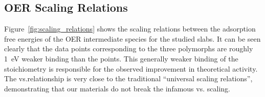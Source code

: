 \subsection{OER Scaling Relations}  %
%


%
%
Figure~\ref{fig:scaling_relations} shows the scaling relations between the adsorption free energies of the OER intermediate species for the studied \IrOx slabs.
%
It can be seen clearly that the data points corresponding to the three \IrOthree polymorphs are roughly \SI{1}{\electronvolt} weaker binding than the \rIrOtwo points.
%
This generally weaker binding of the \IrOthree stoichiometry is responsible for the observed improvement in theoretical activity.
%
The \DGOOH vs.\DGOH relationship is very close to the traditional ``universal scaling relations'', demonstrating that our materials do not break the infamous \DGOOH vs. \DGOH scaling.





